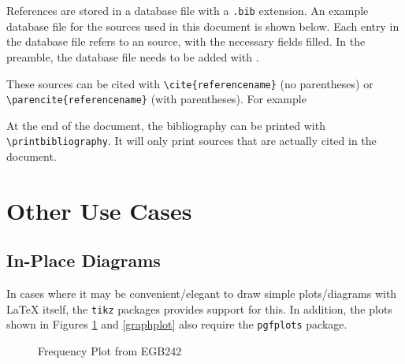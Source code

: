 \documentclass[11pt, twoside]{article}
\begin{document}
References are stored in a database file with a \lstinline{.bib} extension. An example database file for the sources used in this document is shown below. Each entry in the database file refers to an source, with the necessary fields filled. In the preamble, the database file needs to be added with \lstinline||.

These sources can be cited with \lstinline|\cite{referencename}| (no parentheses) or \lstinline|\parencite{referencename}| (with parentheses). For example \parencite{colu92} \cite{smit54}

At the end of the document, the bibliography can be printed with \lstinline{\printbibliography}. It will only print sources that are actually cited in the document.

\section{Other Use Cases}

\subsection{In-Place Diagrams}

In cases where it may be convenient/elegant to draw simple plots/diagrams with LaTeX itself, the \lstinline{tikz} packages provides support for this. In addition, the plots shown in Figures \ref{frequencyplot} and \ref{graphplot} also require the \lstinline{pgfplots} package.

\begin{figure}
    \centering
    \caption{Frequency Plot from EGB242}
    \label{frequencyplot}
\end{figure}
\end{document}

